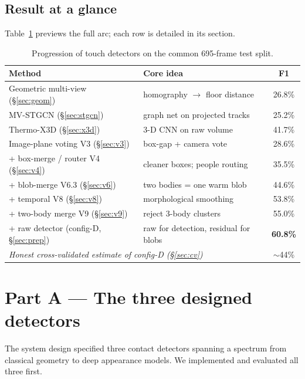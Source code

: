 \documentclass[11pt, a4paper]{article}
\begin{document}
\subsection{Result at a glance}
Table~\ref{tab:arc} previews the full arc; each row is detailed in its section.

\begin{table}[H]\centering
\caption{Progression of touch detectors on the common 695-frame test split.}
\label{tab:arc}
\renewcommand{\arraystretch}{1.2}
\begin{tabular}{l l c}
\toprule
\textbf{Method} & \textbf{Core idea} & \textbf{F1} \\
\midrule
Geometric multi-view (\S\ref{sec:geom})  & homography $\to$ floor distance & 26.8\% \\
MV-STGCN (\S\ref{sec:stgcn})              & graph net on projected tracks   & 25.2\% \\
Thermo-X3D (\S\ref{sec:x3d})              & 3-D CNN on raw volume           & 41.7\% \\
Image-plane voting V3 (\S\ref{sec:v3})    & box-gap + camera vote           & 28.6\% \\
\;+ box-merge / router V4 (\S\ref{sec:v4})& cleaner boxes; people routing   & 35.5\% \\
\;+ blob-merge V6.3 (\S\ref{sec:v6})      & two bodies = one warm blob      & 44.6\% \\
\;+ temporal V8 (\S\ref{sec:v8})          & morphological smoothing         & 53.8\% \\
\;+ two-body merge V9 (\S\ref{sec:v9})    & reject 3-body clusters          & 55.0\% \\
\rowcolor{rowhi}\;+ raw detector (config-D, \S\ref{sec:prep}) & raw for detection, residual for blobs & \textbf{60.8\%} \\
\midrule
\multicolumn{2}{l}{\textit{Honest cross-validated estimate of config-D (\S\ref{sec:cv})}} & $\sim$44\% \\
\bottomrule
\end{tabular}
\end{table}

\section{Part A — The three designed detectors}
The system design specified three contact detectors spanning a spectrum from
classical geometry to deep appearance models. We implemented and evaluated all
three first.
\end{document}
